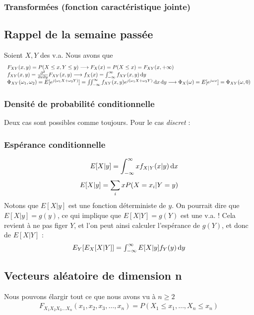 \documentclass[11pt,a4paper]{article}
\numberwithin{equation}{section}
\begin{document}
\subsubsection{Transformées (fonction caractéristique jointe)}

\subsection*{Rappel de la semaine passée}
Soient $X,Y$ des v.a. Nous avons que 
\[\begin{array}{l}
    F_{XY}(x,y) = P(X \leq x, Y \leq y) \longrightarrow F_X(x) = P(X \leq x) = F_{XY}(x,+\infty)\\
    f_{XY}(x,y) = \frac{\partial^2}{\partial x \partial y}F_{XY}(x,y) \longrightarrow f_X(x) = \int_{-\infty}^{\infty} f_{XY}(x,y) \, \mathrm d y\\
    \Phi_{XY}(\omega_1,\omega_2) = E[e^{j(\omega_1 X + \omega_2 Y)}] = \iint_{-\infty}^{\infty} f_{XY}(x,y)e^{j(\omega_1 X + \omega_2 Y)} \, \mathrm d x\, \mathrm d y \longrightarrow \Phi_X(\omega) = E[e^{j\omega x}] = \Phi_{XY}(\omega,0)
\end{array}\]
\subsubsection{Densité de probabilité conditionnelle}
Deux cas sont possibles comme toujours. Pour le cas \textit{discret} : 

\subsubsection{Espérance conditionnelle}
\begin{align}
    	E[X|y] = \int_{-\infty}^{\infty} x f_{X|Y}(x|y) \, \mathrm d x\\
    	E[X|y] = \sum\limits_{i}^{}xP(X=x_i|Y=y)
\end{align}
Notons que $E[X|y]$ est une fonction déterministe de $y$. On pourrait dire que $E[X|y] = g(y)$, ce qui implique que $E[X|Y] = g(Y)$ est une v.a. ! Cela revient à ne pas figer $Y$, et l'on peut ainsi calculer l'espérance de $g(Y)$, et donc de $E[X|Y]$ :
\begin{equation}
	\begin{array}{ll}
            E_Y[E_X[X|Y]] = \int_{-\infty}^{\infty} E[X|y]f_Y(y)\, \mathrm d y
\end{array}
\end{equation}

\subsection{Vecteurs aléatoire de dimension n}
Nous pouvons élargir tout ce que nous avons vu à $n \geq 2$
\begin{equation}
	\begin{array}{l}
            F_{X_1X_2X_3\ldots X_n}(x_1,x_2,x_3,\ldots,x_n) = P(X_1 \leq x_1, \ldots, X_n \leq x_n)
\end{array}
\end{equation}
\end{document}
